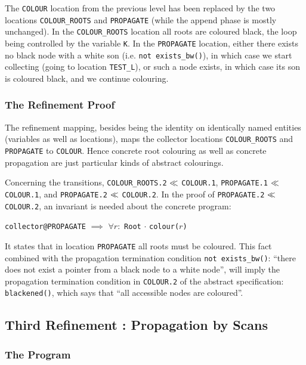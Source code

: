 The {\tt COLOUR} location from the previous level has been replaced by
the two locations {\tt  COLOUR\_ROOTS} and {\tt PROPAGATE} (while  the
append phase is mostly unchanged)\@. In the {\tt COLOUR\_ROOTS} location
all roots  are  coloured black,  the  loop  being controlled  by   the
variable {\tt K}\@. In the {\tt PROPAGATE} location, either there exists
no black node with a white son (i.e. {\tt not exists\_bw()}), in which
case we start collecting (going to  location {\tt TEST\_L}), or such a
node exists, in which case its son is coloured black, and we continue
colouring.


\subsubsection{The Refinement Proof}

The  refinement mapping,  besides  being  the identity on  identically
named entities (variables  as well as  locations), maps the collector
locations {\tt COLOUR\_ROOTS} and {\tt PROPAGATE} to {\tt COLOUR}\@.  Hence
concrete   root  colouring as well  as   concrete propagation are just
particular kinds of abstract colourings.

Concerning the transitions,  
{\tt  COLOUR\_ROOTS.2} $\ll$ {\tt  COLOUR.1}, 
{\tt PROPAGATE.1} $\ll$ {\tt  COLOUR.1},  
and
{\tt PROPAGATE.2} $\ll$ {\tt COLOUR.2}. 
In   the proof  of {\tt PROPAGATE.2} $\ll$ {\tt COLOUR.2}, 
an invariant is needed about the concrete program:

\begin{center}
  {\tt collector@PROPAGATE} $\implies$ $\forall r:$ {\tt Root} $\cdot$ 
  {\tt colour(}$r${\tt )}
\end{center}

It states that in location {\tt PROPAGATE} all roots must be coloured.
This fact combined with the propagation termination condition {\tt not
  exists\_bw()}: ``there does not exist a pointer from a black node to
a  white node'', will  imply  the propagation termination condition in
{\tt  COLOUR.2} of  the  abstract specification:  {\tt blackened()},
which says that ``all accessible nodes are coloured''.


\subsection{Third Refinement : Propagation by Scans}
\label{third-refinement}

\subsubsection{The Program}

